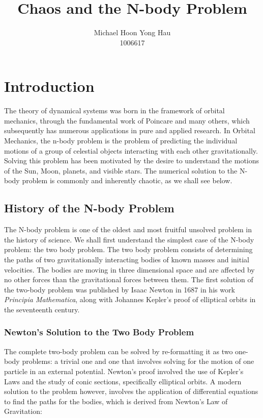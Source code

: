 \documentclass{article}
\title{Chaos and the N-body Problem}
\author{Michael Hoon Yong Hau \\ 1006617}
\begin{document}
\maketitle

\tableofcontents

\newpage

\section{Introduction}
The theory of dynamical systems was born in the framework of orbital mechanics, through the fundamental work of Poincare and many others, which subsequently has numerous applications in pure and applied research. In Orbital Mechanics, the n-body problem is the problem of predicting the individual motions of a group of celestial objects interacting with each other gravitationally. Solving this problem has been motivated by the desire to understand the motions of the Sun, Moon, planets, and visible stars. The numerical solution to the N-body problem is commonly and inherently chaotic, as we shall see below. \\

\subsection{History of the N-body Problem}
The N-body problem is one of the oldest and most fruitful unsolved problem in the history of science. We shall first understand the simplest case of the N-body problem: the two body problem. The two body problem consists of determining the paths of two gravitationally interacting bodies of known masses and initial velocities. The bodies are moving in three dimensional space and are affected by no other forces than the gravitational forces between them. The first solution of the two-body problem was published by Isaac Newton in 1687 in his work \textit{Principia Mathematica}, along with Johannes Kepler's proof of elliptical orbits in the seventeenth century. 

\subsubsection{Newton's Solution to the Two Body Problem}
The complete two-body problem can be solved by re-formatting it as two one-body problems: a trivial one and one that involves solving for the motion of one particle in an external potential. Newton's proof involved the use of Kepler's Laws and the study of conic sections, specifically elliptical orbits. A modern solution to the problem however, involves the application of differential equations to find the paths for the bodies, which is derived from Newton's Law of Gravitation: 
\end{document}
